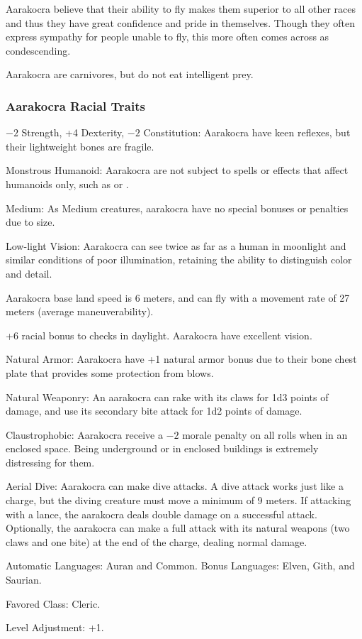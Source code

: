 Aarakocra believe that their ability to fly makes them superior to all other races and thus they have great confidence and pride in themselves. Though they often express sympathy for people unable to fly, this more often comes across as condescending.

Aarakocra are carnivores, but do not eat intelligent prey.

\subsubsection{Aarakocra Racial Traits}
\begin{itemize*}
    \item $-2$ Strength, +4 Dexterity, $-2$ Constitution: Aarakocra have keen reflexes, but their lightweight bones are fragile.
    \item Monstrous Humanoid: Aarakocra are not subject to spells or effects that affect humanoids only, such as  or .
    \item Medium: As Medium creatures, aarakocra have no special bonuses or penalties due to size.
    \item Low-light Vision: Aarakocra can see twice as far as a human in moonlight and similar conditions of poor illumination, retaining the ability to distinguish color and detail.
    \item Aarakocra base land speed is 6 meters, and can fly with a movement rate of 27 meters (average maneuverability).
    \item +6 racial bonus to  checks in daylight. Aarakocra have excellent vision.
    \item Natural Armor: Aarakocra have +1 natural armor bonus due to their bone chest plate that provides some protection from blows.
    \item Natural Weaponry: An aarakocra can rake with its claws for 1d3 points of damage, and use its secondary bite attack for 1d2 points of damage.
    \item Claustrophobic: Aarakocra receive a $-2$ morale penalty on all rolls when in an enclosed space. Being underground or in enclosed buildings is extremely distressing for them.
    \item Aerial Dive: Aarakocra can make dive attacks. A dive attack works just like a charge, but the diving creature must move a minimum of 9 meters. If attacking with a lance, the aarakocra deals double damage on a successful attack. Optionally, the aarakocra can make a full attack with its natural weapons (two claws and one bite) at the end of the charge, dealing normal damage.
    \item Automatic Languages: Auran and Common. Bonus Languages: Elven, Gith, and Saurian.
    \item Favored Class: Cleric.
    \item Level Adjustment: +1.
\end{itemize*}